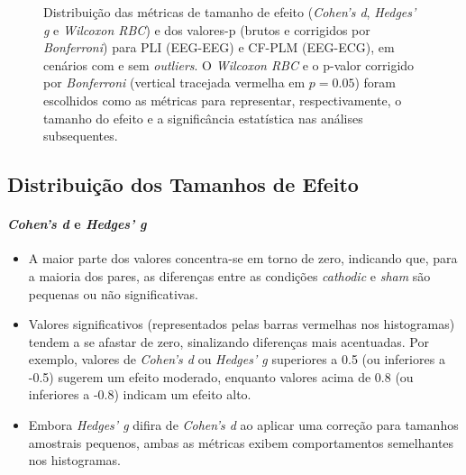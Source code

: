 \begin{figure}[htb]
{    }
    \caption[Distribuições de tamanhos de efeito e valores-p]{Distribuição das métricas de tamanho de efeito (\textit{Cohen's d}, \textit{Hedges' g} e \textit{Wilcoxon RBC}) e dos valores-p (brutos e corrigidos por \textit{Bonferroni}) para PLI (EEG-EEG) e CF-PLM (EEG-ECG), em cenários com e sem \textit{outliers}. O \textit{Wilcoxon RBC} e o p-valor corrigido por \textit{Bonferroni} (vertical tracejada vermelha em $p=0.05$) foram escolhidos como as métricas para representar, respectivamente, o tamanho do efeito e a significância estatística nas análises subsequentes.}
    \label{fig:effectsizehist_all}    
\end{figure}

\subsection{Distribuição dos Tamanhos de Efeito}
\paragraph{\textit{Cohen's d} e \textit{Hedges' g}}
\begin{itemize}
    \item A maior parte dos valores concentra-se em torno de zero, indicando que, para a maioria dos pares, as diferenças entre as condições \textit{cathodic} e \textit{sham} são pequenas ou não significativas.
    \item Valores significativos (representados pelas barras vermelhas nos histogramas) tendem a se afastar de zero, sinalizando diferenças mais acentuadas. Por exemplo, valores de \textit{Cohen's d} ou \textit{Hedges' g} superiores a 0.5 (ou inferiores a -0.5) sugerem um efeito moderado, enquanto valores acima de 0.8 (ou inferiores a -0.8) indicam um efeito alto.
    \item Embora \textit{Hedges' g} difira de \textit{Cohen's d} ao aplicar uma correção para tamanhos amostrais pequenos, ambas as métricas exibem comportamentos semelhantes nos histogramas.
\end{itemize}

